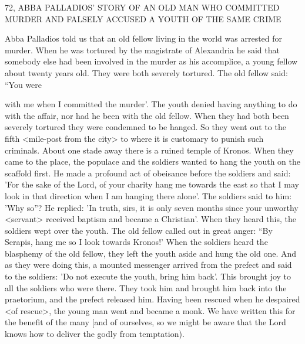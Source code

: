 72, ABBA PALLADIOS' STORY OF AN OLD MAN WHO
COMMITTED MURDER AND FALSELY ACCUSED
A YOUTH OF THE SAME CRIME

Abba Palladios told us that an old fellow living in the world was
arrested for murder.
When he was tortured by the magistrate of
Alexandria he said that somebody else had been involved in the
murder as his accomplice, a young fellow about twenty years old.
They were both severely tortured.
The old fellow said: “You were

with me when I committed the murder'.
The youth denied having
anything to do with the affair, nor had he been with the old fellow.
When they had both been severely tortured they were condemned
to be hanged.
So they went out to the fifth <mile-post from the
city> to where it is customary to punish such criminals.
About one
stade away there is a ruined temple of Kronos.
When they came to
the place, the populace and the soldiers wanted to hang the youth
on the scaffold first.
He made a profound act of obeisance before
the soldiers and said: 'For the sake of the Lord, of your charity
hang me towards the east so that I may look in that direction when
I am hanging there alone'.
The soldiers said to him: 'Why so”? He
replied: 'In truth, sirs, it is only seven months since your unworthy
<servant> received baptism and became a Christian'.
When they
heard this, the soldiers wept over the youth.
The old fellow called
out in great anger: “By Serapis, hang me so I look towards Kronos!'
When the soldiers heard the blasphemy of the old fellow, they left
the youth aside and hung the old one.
And as they were doing this,
a mounted messenger arrived from the prefect and said to the
soldiers: 'Do not execute the youth, bring him back'.
This brought
joy to all the soldiers who were there.
They took him and brought
him back into the praetorium, and the prefect released him.
Having
been rescued when he despaired <of rescue>, the young man went
and became a monk.
We have written this for the benefit of the
many [and of ourselves, so we might be aware that the Lord knows
how to deliver the godly from temptation).

